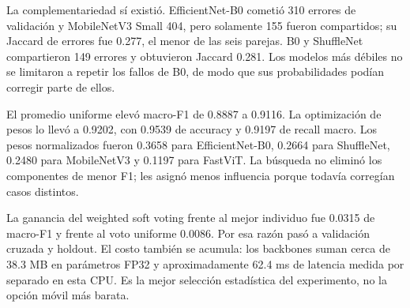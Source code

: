 La complementariedad sí existió. EfficientNet-B0 cometió 310 errores de
validación y MobileNetV3 Small 404, pero solamente 155 fueron compartidos; su
Jaccard de errores fue 0.277, el menor de las seis parejas. B0 y ShuffleNet
compartieron 149 errores y obtuvieron Jaccard 0.281. Los modelos más débiles no
se limitaron a repetir los fallos de B0, de modo que sus probabilidades podían
corregir parte de ellos.

El promedio uniforme elevó macro-F1 de 0.8887 a 0.9116. La optimización de
pesos lo llevó a 0.9202, con 0.9539 de accuracy y 0.9197 de recall macro. Los
pesos normalizados fueron 0.3658 para EfficientNet-B0, 0.2664 para ShuffleNet,
0.2480 para MobileNetV3 y 0.1197 para FastViT. La búsqueda no eliminó los
componentes de menor F1; les asignó menos influencia porque todavía corregían
casos distintos.

La ganancia del weighted soft voting frente al mejor individuo fue 0.0315 de
macro-F1 y frente al voto uniforme 0.0086. Por esa razón pasó a validación
cruzada y holdout. El costo también se acumula: los backbones suman cerca de
38.3 MB en parámetros FP32 y aproximadamente 62.4 ms de latencia medida por
separado en esta CPU. Es la mejor selección estadística del experimento, no la
opción móvil más barata.

